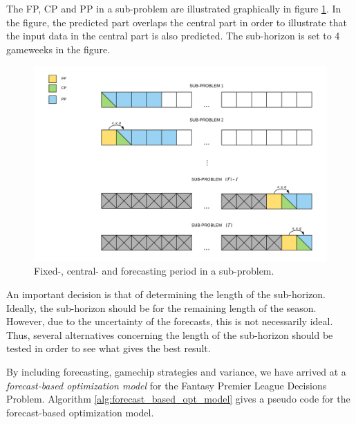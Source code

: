 The FP, CP and PP in a sub-problem are illustrated graphically in figure \ref{fig:rolling_horizon}. In the figure, the predicted part overlaps the central part in order to illustrate that the input data in the central part is also predicted. The sub-horizon is set to 4 gameweeks in the figure. 

\begin{figure}[H]
    \centering
    \includegraphics[scale = 0.47]{fig/chapter_5/rolling_horizon.png}
    \caption{Fixed-, central- and forecasting period in a sub-problem.}
    \label{fig:rolling_horizon}
\end{figure}

\newpar

An important decision is that of determining the length of the sub-horizon. Ideally, the sub-horizon should be for the remaining length of the season. However, due to the uncertainty of the forecasts, this is not necessarily ideal. Thus, several alternatives concerning the length of the sub-horizon should be tested in order to see what gives the best result. 

\newpar

By including forecasting, gamechip strategies and variance, we have arrived at a \textit{forecast-based optimization model} for the Fantasy Premier League Decisions Problem. Algorithm \ref{alg:forecast_based_opt_model} gives a pseudo code for the forecast-based optimization model.


\newpar

